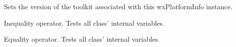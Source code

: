 Sets the version of the toolkit associated with this wxPlatformInfo instance.



\label{wxplatforminfooperatorunknown}


Inequality operator. Tests all class' internal variables.


\label{wxplatforminfooperatorequal}


Equality operator. Tests all class' internal variables.

